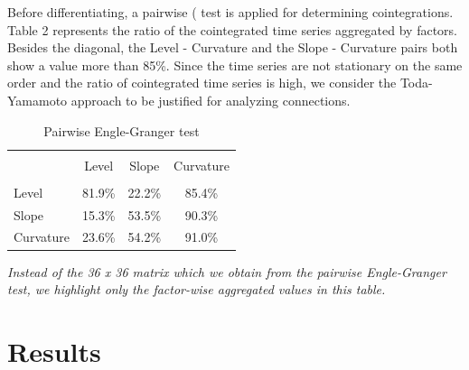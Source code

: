 \documentclass[12pt,bibliography=totoc]{article}
\begin{document}
Before differentiating, a pairwise  (\cite{engle1987co} test is applied for determining cointegrations. Table 2 represents the ratio of the cointegrated time series aggregated by factors. Besides the diagonal, the Level - Curvature and the Slope - Curvature pairs both show a value more than 85\%. Since the time series are not stationary on the same order and the ratio of cointegrated time series is high, we consider the Toda-Yamamoto approach to be justified for analyzing connections.

\begin{table}[H]


\centering%
\begin{tabular}{l | ccc}%
\hline\hline \\ [-1.5ex]                         %

	&	Level 	&	Slope	&	Curvature	\\
\hline \\ [-1.5ex]  
Level	&	81.9\%	&	22.2\%	&	85.4\%	\\
Slope	&	15.3\%	&	53.5\%	&	90.3\%	\\
Curvature	&	23.6\%	&	54.2\%	&	91.0\%	\\


\hline            





\end{tabular}
\label{table:nonlin}%
\caption{Pairwise Engle-Granger test} %
\end{table}

    \begin{tablenotes}
      \small
     \item \centering \textit{Instead of the 36 x 36 matrix which we obtain from the pairwise Engle-Granger test, we highlight only the factor-wise aggregated values in this table.}
    \end{tablenotes}




\section{Results}
\end{document}
